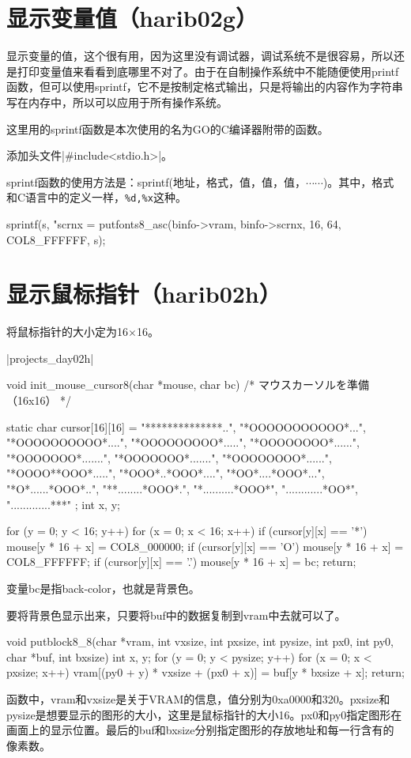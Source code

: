 \begin{code}[label=bootpack.c节选]
\section{	显示变量值（harib02g）	}
显示变量的值，这个很有用，因为这里没有调试器，调试系统不是很容易，所以还是打印变量值来看看到底哪里不对了。由于在自制操作系统中不能随便使用printf函数，但可以使用sprintf，它不是按制定格式输出，只是将输出的内容作为字符串写在内存中，所以可以应用于所有操作系统。

这里用的sprintf函数是本次使用的名为GO的C编译器附带的函数。

\cs

添加头文件|#include<stdio.h>|。

sprintf函数的使用方法是：sprintf(地址，格式，值，值，值，$\cdots\cdots$)。其中，格式和C语言中的定义一样，\verb|%d,%x|这种。
\begin{code}
    sprintf(s, "scrnx = %
	putfonts8_asc(binfo->vram, binfo->scrnx, 16, 64, COL8_FFFFFF, s);
\end{code}
\section{	显示鼠标指针（harib02h）	}
将鼠标指针的大小定为16$\times$16。

\dag|projects_day\harib02h|
\begin{code}[label=bootpack.c]
void init_mouse_cursor8(char *mouse, char bc)
/* マウスカーソルを準備（16x16） */
{
	static char cursor[16][16] = {
		"**************..",
		"*OOOOOOOOOOO*...",
		"*OOOOOOOOOO*....",
		"*OOOOOOOOO*.....",
		"*OOOOOOOO*......",
		"*OOOOOOO*.......",
		"*OOOOOOO*.......",
		"*OOOOOOOO*......",
		"*OOOO**OOO*.....",
		"*OOO*..*OOO*....",
		"*OO*....*OOO*...",
		"*O*......*OOO*..",
		"**........*OOO*.",
		"*..........*OOO*",
		"............*OO*",
		".............***"
	};
	int x, y;

	for (y = 0; y < 16; y++) {
		for (x = 0; x < 16; x++) {
			if (cursor[y][x] == '*') {
				mouse[y * 16 + x] = COL8_000000;
			}
			if (cursor[y][x] == 'O') {
				mouse[y * 16 + x] = COL8_FFFFFF;
			}
			if (cursor[y][x] == '.') {
				mouse[y * 16 + x] = bc;
			}
		}
	}
	return;
}
\end{code}
变量bc是指back-color，也就是背景色。

要将背景色显示出来，只要将buf中的数据复制到vram中去就可以了。
\begin{code}[label=bootpack.c]
void putblock8_8(char *vram, int vxsize, int pxsize,
	int pysize, int px0, int py0, char *buf, int bxsize)
{
	int x, y;
	for (y = 0; y < pysize; y++) {
		for (x = 0; x < pxsize; x++) {
			vram[(py0 + y) * vxsize + (px0 + x)] = buf[y * bxsize + x];
		}
	}
	return;
}
\end{code}
函数中，vram和vxsize是关于VRAM的信息，值分别为0xa0000和320。pxsize和pysize是想要显示的图形的大小，这里是鼠标指针的大小16。px0和py0指定图形在画面上的显示位置。最后的buf和bxsize分别指定图形的存放地址和每一行含有的像素数。


\end{code}
